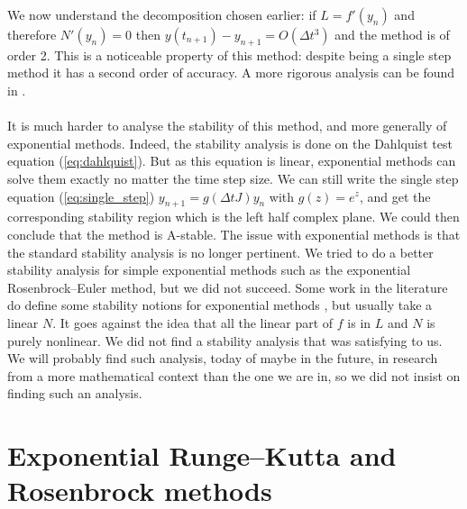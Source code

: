       We now understand the decomposition chosen earlier: if $L = f'\left(y_n\right)$ and therefore $N'\left(y_n\right) = 0$ then $y\left(t_{n+1}\right) - y_{n+1} = O\left(\Delta t^3\right)$ and the method is of order 2.
      This is a noticeable property of this method: despite being a single step method it has a second order of accuracy.
      A more rigorous analysis can be found in \cite{HochbruckOstermannSchweitzer2009}.

      \paragraph{}
      It is much harder to analyse the stability of this method, and more generally of exponential methods.
      Indeed, the stability analysis is done on the Dahlquist test equation (\ref{eq:dahlquist}).
      But as this equation is linear, exponential methods can solve them exactly no matter the time step size.
      We can still write the single step equation (\ref{eq:single_step}) $y_{n+1} = g\left(\Delta tJ\right)y_n$ with $g\left(z\right) = e^z$, and get the corresponding stability region which is the left half complex plane.
      We could then conclude that the method is A-stable.
      The issue with exponential methods is that the standard stability analysis is no longer pertinent.
      We tried to do a better stability analysis for simple exponential methods such as the exponential Rosenbrock--Euler method, but we did not succeed.
      Some work in the literature do define some stability notions for exponential methods \cite{DuZhu2004}, but usually take a linear $N$.
      It goes against the idea that all the linear part of $f$ is in $L$ and $N$ is purely nonlinear.
      We did not find a stability analysis that was satisfying to us.
      We will probably find such analysis, today of maybe in the future, in research from a more mathematical context than the one we are in, so we did not insist on finding such an analysis.


  \section{Exponential Runge--Kutta and Rosenbrock methods}

